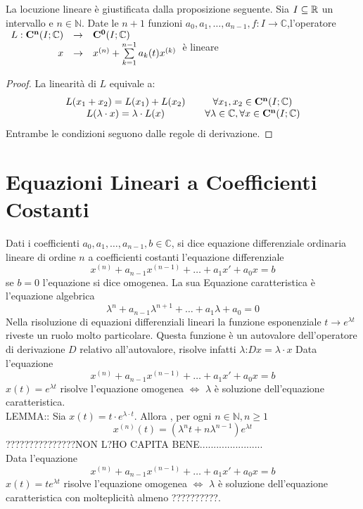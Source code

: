 \observation
La locuzione lineare è giustificata dalla proposizione seguente.
\proposition
Sia $I\subseteq \mathbb{R}$ un intervallo e $n\in\mathbb{N}$. Date le $n+1$ funzioni $a_0,a_1,\ldots,a_{n-1},f:I\to\mathbb{C}$,l'operatore 
$\begin{array}{rcl} 
L: \mathbf{C^{n}}(I;\mathbb{C}) & \to & \mathbf{C^{0}}(I;\mathbb{C}) \\
x & \to & x^{(n)}+\sum\limits_{k=1}^{n-1}a_k(t)x^{(k)} \\ 
\end{array}$è lineare
\begin{proof}
	La linearità di $L$ equivale a:
	$$ \begin{matrix}L(x_1+x_2)=L(x_1)+L(x_2) && \forall x_1,x_2\in \mathbf{C^{n}}(I;\mathbb{C})\\L(\lambda\cdot x)=\lambda\cdot L(x) && \forall\lambda\in\mathbb{C}, \forall x\in \mathbf{C^{n}}(I;\mathbb{C})\end{matrix} $$
	Entrambe le condizioni  seguono dalle regole di derivazione.
\end{proof}
\section{Equazioni Lineari a Coefficienti Costanti}
Dati i coefficienti $a_0,a_1,\ldots,a_{n-1},b\in\mathbb{C}$, si dice equazione differenziale ordinaria lineare di ordine $n$ a coefficienti costanti l'equazione differenziale
$$x^{(n)}+a_{n-1}x^{(n-1)}+\ldots+a_1 x'+a_0x=b$$
se $b=0$ l'equazione si dice omogenea. La sua Equazione caratteristica è l'equazione algebrica
$$\lambda^n+a_{n-1}\lambda^{n+1}+\ldots+a_1\lambda+a_0=0$$ 
\observation
Nella risoluzione di equazioni differenziali lineari la funzione esponenziale $t\to e^{\lambda t}$ riveste un ruolo molto particolare. Questa funzione è un autovalore dell'operatore di derivazione $D$ relativo all'autovalore, risolve infatti $\lambda$:$Dx=\lambda\cdot x$ 
\proposition
Data l'equazione
$$x^{(n)}+a_{n-1}x^{(n-1)}+\ldots+a_1 x'+a_0x=b$$
$x(t)=e^{\lambda t}$ risolve l'equazione omogenea $\Leftrightarrow$ $\lambda$ è soluzione dell'equazione caratteristica.\\

LEMMA:: Sia $x(t)=t\cdot e^{\lambda\cdot t}$. Allora , per ogni $n\in\mathbb{N}, n\ge 1$
$$x^{(n)}(t)=\left(\lambda^nt+n\lambda^{n-1}\right)e^{\lambda t}$$
???????????????NON L?HO CAPITA BENE.......................\\
\proposition
Data l'equazione 
$$x^{(n)}+a_{n-1}x^{(n-1)}+\ldots+a_1 x'+a_0x=b$$
$x(t)=te^{\lambda t}$ risolve l'equazione omogenea $\Leftrightarrow$ $\lambda$ è soluzione dell'equazione caratteristica con molteplicità almeno ??????????.


